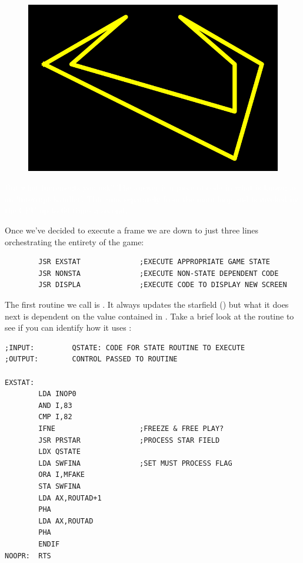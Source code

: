 \begin{definition}
\setlength{\intextsep}{0pt}%
\setlength{\columnsep}{3pt}%
\begin{figure}
\includegraphics[width=\linewidth]{src/callout/claw_t.png} 
\end{figure}
\small
\textcolor{white}{
  But what increments  you ask? The answer is a piece of code in what is known
  as an 'interrupt handler'. This runs separately from the main loop and is invoked by the CPU up to 60
  times a second.
}
\end{definition}

Once we've decided to execute a frame we are down to just three lines orchestrating the entirety of the game:

\begin{lstlisting}
        JSR EXSTAT              ;EXECUTE APPROPRIATE GAME STATE
        JSR NONSTA              ;EXECUTE NON-STATE DEPENDENT CODE
        JSR DISPLA              ;EXECUTE CODE TO DISPLAY NEW SCREEN
\end{lstlisting}

The first routine we call is . It always updates the starfield () but what it
does next is dependent on the value contained in . Take a brief look at the routine to see if
you can identify how it uses :
\begin{lstlisting}
;INPUT:         QSTATE: CODE FOR STATE ROUTINE TO EXECUTE
;OUTPUT:        CONTROL PASSED TO ROUTINE

EXSTAT:
        LDA INOP0
        AND I,83
        CMP I,82
        IFNE                    ;FREEZE & FREE PLAY?
        JSR PRSTAR              ;PROCESS STAR FIELD
        LDX QSTATE
        LDA SWFINA              ;SET MUST PROCESS FLAG
        ORA I,MFAKE
        STA SWFINA
        LDA AX,ROUTAD+1
        PHA
        LDA AX,ROUTAD
        PHA
        ENDIF
NOOPR:  RTS
\end{lstlisting}

